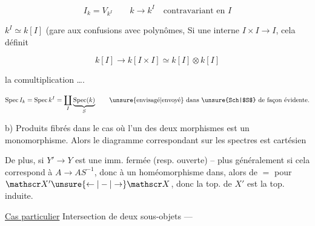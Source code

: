 
\[
I_k=V_{k^I}\qquad k\to k^I\quad\text{contravariant en $I$}
\]


$k^I\simeq k[I]$  (gare aux confusions avec polynômes, Si   une   interne $I\times I\to I$, cela définit

\[
k[I]\longrightarrow k[I\times I]\simeq k[I]\otimes k[I]
\]

la comultiplication \ldots.


\[
\mathrm{Spec}\,I_k=\mathrm{Spec}\,k^I=\coprod_I\underbrace{\mathrm{Spec}(k)}_{S}
\qquad\text{\unsure{envisagé|envoyé} dans \unsure{Sch|$S$} de façon évidente.}
\]

b) Produits fibrés dans le cas où l'un des deux morphismes est un monomorphisme. Alors le diagramme correspondant sur les spectres est cartésien



De plus, si \uline{$Y'\to Y$} est une imm. fermée (resp. ouverte) -- plus généralement si cela correspond à $A\to AS^{-1}$, donc à un homéomorphisme dans, alors  de $=$ pour $\mathscr X'\unsure{\leftarrow|-|\to}\mathscr X$, donc la top. de $X'$ est la top. induite.

\uline{Cas particulier} Intersection de deux sous-objets ---


